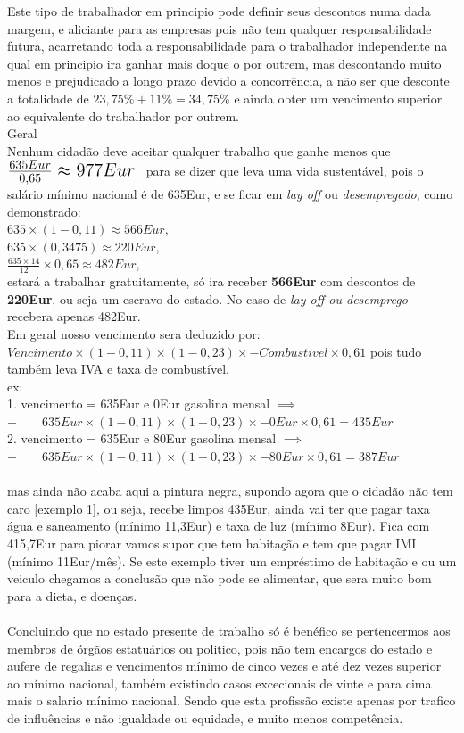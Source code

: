 Este tipo de trabalhador em principio pode definir seus descontos numa dada margem, e aliciante para as empresas pois não tem qualquer responsabilidade futura, acarretando toda a responsabilidade para o trabalhador independente na qual em principio ira ganhar mais doque o por outrem, mas descontando muito menos e prejudicado a longo prazo devido a concorrência, a não ser que desconte a totalidade de $23,75\%+11\%=34,75\%$ e ainda obter um vencimento superior ao equivalente do trabalhador por outrem.\\

Geral\\
Nenhum cidadão deve aceitar qualquer trabalho que ganhe menos que \; $ \mbox{\Large $ \frac{635Eur}{0,65}\approx 977Eur $ } $ para se dizer que leva uma vida sustentável, pois o salário mínimo nacional é de 635Eur, e se ficar em \textit{lay off} ou \textit{desempregado}, como demonstrado:\\
$635\times(1-0,11)\approx566Eur$,\\
$635\times(0,3475)\approx220Eur$,\\
$\frac{635\times14}{12}\times0,65 \approx 482Eur$, \\
estará a trabalhar gratuitamente, só ira receber \textbf{566Eur} com descontos de \textbf{220Eur}, ou seja um escravo do estado. No caso de \textit{lay-off ou desemprego} recebera apenas 482Eur.\\

Em geral nosso vencimento sera deduzido por: $Vencimento \times (1-0,11) \times (1-0,23) \times - Combustivel\times 0,61$ pois tudo também leva IVA e taxa de combustível.\\
ex:\\
1. vencimento = 635Eur e 0Eur gasolina mensal $\implies$ \\
$- \qquad 635Eur \times (1-0,11) \times (1-0,23) \times - 0Eur \times 0,61 = 435Eur$ \\
2. vencimento = 635Eur e 80Eur gasolina mensal $\implies$ \\
$- \qquad 635Eur \times (1-0,11) \times (1-0,23) \times - 80Eur \times 0,61 = 387Eur$ \\ \\
mas ainda não acaba aqui a pintura negra, supondo agora que o cidadão não tem caro [exemplo 1], ou seja, recebe limpos 435Eur, ainda vai ter que pagar taxa água e saneamento (mínimo 11,3Eur) e taxa de luz (mínimo 8Eur). Fica com 415,7Eur para piorar vamos supor que tem habitação e tem que pagar IMI (mínimo 11Eur/mês).
Se este exemplo tiver um empréstimo de habitação e ou um veiculo chegamos a conclusão que não pode se alimentar, que sera muito bom para a dieta, e doenças.\\ \\
Concluindo que no estado presente de trabalho só é benéfico se pertencermos aos membros de órgãos estatuários ou politico, pois não tem encargos do estado e aufere de regalias e vencimentos mínimo de cinco vezes e até dez vezes superior ao mínimo nacional, também existindo casos excecionais de vinte e para cima mais o salario mínimo nacional. Sendo que esta profissão existe apenas por trafico de influências e não igualdade ou equidade, e muito menos competência.\\


